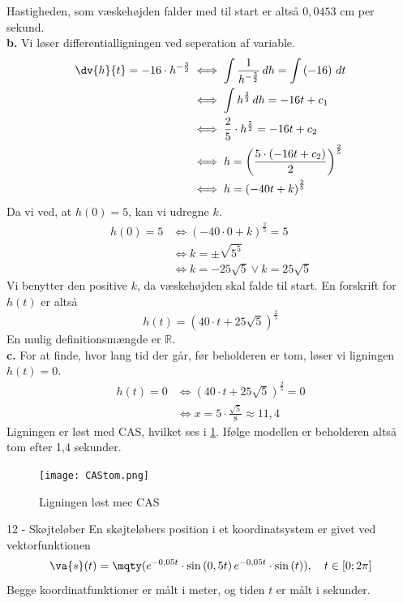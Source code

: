 \documentclass{article}
\begin{document}
Hastigheden, som væskehøjden falder med til start er altså $0,0453$ cm per sekund. \\[1ex]
\textbf{b.}
Vi løser differentialligningen ved seperation af variable.
\begin{equation*}
\begin{split}
  \dv{h}{t}=-16 \cdot h ^{-\frac{3}{2}} &\iff \int \frac{1}{h ^{-\frac{3}{2}}} \,dh = \int \left(-16\right)  \,dt \\
  &\iff \int h ^{\frac{3}{2}} \,dh =-16 t + c_1 \\
  &\iff \frac{2}{5} \cdot h ^{\frac{5}{2}} = -16t + c_2 \\
  &\iff h=\left(\frac{5 \cdot (-16t + c_2)}{2}\right)^{\frac{2}{5}} \\
  &\iff h=\left(-40 t + k\right) ^{\frac{2}{5}} 
\end{split}
\end{equation*}
Da vi ved, at $h(0)=5$, kan vi udregne $k$.
\begin{equation*}
\begin{split}
  h(0)=5 &\iff \left(-40 \cdot 0 + k\right) ^{\frac{2}{5}} =5 \\
  &\iff k=\pm \sqrt{5^5} \\
  &\iff k=-25 \sqrt{5}  \lor k = 25 \sqrt{5} 
\end{split}
\end{equation*}
Vi benytter den positive $k$, da væskehøjden skal falde til start.
En forskrift for $h(t)$ er altså
\[
h(t)=\left(40 \cdot t + 25 \sqrt{5} \right) ^{\frac{2}{5}}
\] 
En mulig definitionsmængde er $\mathbb{R}$.\\[1ex]
\textbf{c.}
For at finde, hvor lang tid der går, før beholderen er tom, løser vi ligningen $h(t)=0$.
\begin{equation*}
\begin{split}
  h(t)=0 &\iff (40 \cdot t + 25 \sqrt{5} ) ^{\frac{2}{5}} =0\\
  &\iff x=5 \cdot \frac{\sqrt{5} }{8} \approx 11,4
\end{split}
\end{equation*}
Ligningen er løst med CAS, hvilket ses i \cref{fig:CAStom}.
Ifølge modellen er beholderen altså tom efter 1,4 sekunder.
\begin{figure}[H]
\begin{center}
  \texttt{[image: CAStom.png]}
\end{center}
\caption{Ligningen løst mec CAS}
\label{fig:CAStom}
\end{figure}
\begin{question*}{12 - Skøjteløber}{}
En skøjteløbers position i et koordinatsystem er givet ved vektorfunktionen
\[
  \va{s} (t)=\mqty(e^{-0,05t} \cdot \sin\left(0,5t\right) \\ e^{-0,05t} \cdot \sin\left(t\right) ), \quad t \in [0;2 \pi ]
\] 
Begge koordinatfunktioner er målt i meter, og tiden $t$ er målt i sekunder.
\end{question*}
\end{document}
